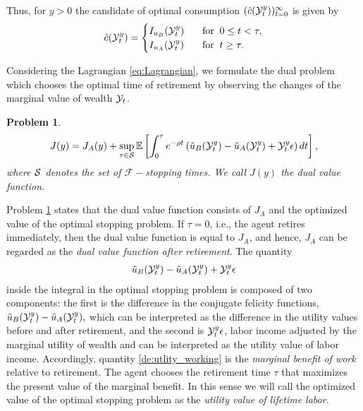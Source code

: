 \documentclass[a4paper,report, 11pt]{article}
\newtheorem{pr}{Problem}
\def\e{\epsilon}
\def\be{\begin{eqnarray}}
\def\ee{\end{eqnarray}}
\begin{document}
Thus, for $y>0$ the candidate of optimal consumption $(\hat{c}({\cal Y}_t^y))_{t=0}^{\infty}$ is given by 
{\begin{eqnarray}
\begin{split}\label{eq:candi-opti}
\hat{c}({\cal Y}_t^y)  =  
\begin{cases}
I_{u_B}({\cal Y}_t^y)\;\;\;&\mbox{for}\;\;0\le t <\tau,\\
I_{u_A}({\cal Y}_t^y)\;\;\;&\mbox{for}\;\;t\ge \tau.
\end{cases}
\end{split}
\end{eqnarray}}

Considering the Lagrangian \eqref{eq:Lagrangian}, we formulate the dual problem which chooses the optimal time of retirement by observing the changes of the marginal value of wealth ${\cal Y}_t$.
\begin{pr}\label{pr:optimal_stopping}
	\begin{equation}\label{eq:dual_value}
	J(y) = J_A(y) + \sup_{\tau \in {\cal S}} \mathbb{E}\left[\int_0^\tau e^{-\rho t}\left(\tilde{u}_B({\cal Y}_t^y )-\tilde{u}_A({\cal Y}_t^y)+{\cal Y}_t^y \e\right)dt\right],
	\end{equation}
where ${\cal S}$ denotes the set of ${\mathcal F}-$stopping times. We call  $J(y)$ the {\em dual value function}. 
\end{pr}

Problem \ref{pr:optimal_stopping} states that the dual value function consists of $J_A$ and the optimized value of the optimal stopping problem. If $\tau=0$, i.e., the agent retires immediately, then the dual value function is equal to $J_A$, and hence, $J_A$ can be regarded as the {\em dual value function after retirement}. The quantity
\be\label{de:utlity_working}
\tilde{u}_B({\cal Y}_t^y )-\tilde{u}_A({\cal Y}_t^y)+{\cal Y}_t^y \e
\ee
 inside the integral in the optimal stopping problem is composed of two components: the first is the difference in the conjugate felicity functions, 
$\tilde{u}_B({\cal Y}_t^y )-\tilde{u}_A({\cal Y}_t^y),$ which can be interpreted as the difference in the utility values before and after retirement, and the second is ${\cal Y}_t^y \e$, labor income adjusted by the marginal utility of wealth and can be interpreted as the utility value of labor income. Accordingly,  quantity \eqref{de:utlity_working} is the {\em marginal benefit of work} relative to retirement. The agent  chooses the retirement time $\tau$ that maximizes the present value of the marginal benefit. In this sense we will call the optimized value of the optimal stopping problem as the {\em utility value of lifetime labor.}  
\end{document}

